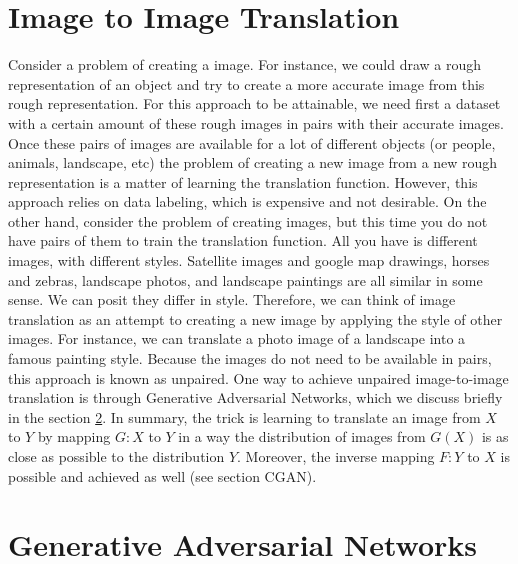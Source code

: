 \documentclass[]{IEEEtran}
\begin{document}
\section{Image to Image Translation}\label{}
Consider a problem of creating a image. For instance, we could draw a rough representation of an object and try to create a more accurate image from this rough representation. For this approach to be attainable, we need first a dataset with a certain amount of these rough images in pairs with their accurate images. Once these pairs of images are available for a lot of different objects (or people, animals, landscape, etc) the problem of creating a new image from a new rough representation is a matter of learning the translation function. However, this approach relies on data labeling, which is expensive and not desirable. On the other hand, consider the problem of creating images, but this time you do not have pairs of them to train the translation function. All you have is different images, with different styles. Satellite images and google map drawings, horses and zebras, landscape photos, and landscape paintings are all similar in some sense. We can posit they differ in style. Therefore, we can think of image translation as an attempt to creating a new image by applying the style of other images. For instance, we can translate a photo image of a landscape into a famous painting style. Because the images do not need to be available in pairs, this approach is known as unpaired. One way to achieve unpaired image-to-image translation is through  Generative Adversarial Networks, which we discuss briefly in the section \ref{GANs}. In summary, the trick is learning to translate an image from $X$ to $Y$ by mapping $G : X$ to $Y$ in a way the distribution of images from $G(X)$ is as close as possible to the distribution $Y$. Moreover, the inverse mapping $F : Y$ to $X$ is possible and achieved as well (see section CGAN). 


\section{Generative Adversarial Networks}\label{GANs}
\end{document}
